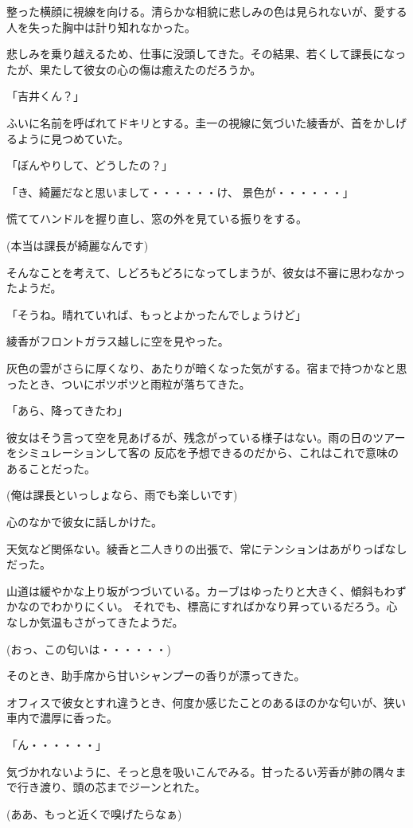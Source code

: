 ﻿\documentclass[book,tate]{jlreq}
\begin{document}
整った横顔に視線を向ける。清らかな相貌に悲しみの色は見られないが、愛する人を失った胸中は計り知れなかった。

悲しみを乗り越えるため、仕事に没頭してきた。その結果、若くして課長になったが、果たして彼女の心の傷は癒えたのだろうか。

「吉井くん？」

ふいに名前を呼ばれてドキリとする。圭一の視線に気づいた綾香が、首をかしげるように見つめていた。

「ぼんやりして、どうしたの？」

「き、綺麗だなと思いまして・・・・・・け、 景色が・・・・・・」

慌ててハンドルを握り直し、窓の外を見ている振りをする。

(本当は課長が綺麗なんです)

そんなことを考えて、しどろもどろになってしまうが、彼女は不審に思わなかったようだ。

「そうね。晴れていれば、もっとよかったんでしょうけど」

綾香がフロントガラス越しに空を見やった。

灰色の雲がさらに厚くなり、あたりが暗くなった気がする。宿まで持つかなと思ったとき、ついにポツポツと雨粒が落ちてきた。

「あら、降ってきたわ」

彼女はそう言って空を見あげるが、残念がっている様子はない。雨の日のツアーをシミュレーションして客の
反応を予想できるのだから、これはこれで意味のあることだった。

(俺は課長といっしょなら、雨でも楽しいです)

心のなかで彼女に話しかけた。

天気など関係ない。綾香と二人きりの出張で、常にテンションはあがりっぱなしだった。

山道は緩やかな上り坂がつづいている。カーブはゆったりと大きく、傾斜もわずかなのでわかりにくい。
それでも、標高にすればかなり昇っているだろう。心なしか気温もさがってきたようだ。

(おっ、この匂いは・・・・・・)

そのとき、助手席から甘いシャンプーの香りが漂ってきた。

オフィスで彼女とすれ違うとき、何度か感じたことのあるほのかな匂いが、狭い車内で濃厚に香った。

「ん・・・・・・」

気づかれないように、そっと息を吸いこんでみる。甘ったるい芳香が肺の隅々まで行き渡り、頭の芯までジーンとれた。

(ああ、もっと近くで嗅げたらなぁ)
\end{document}
